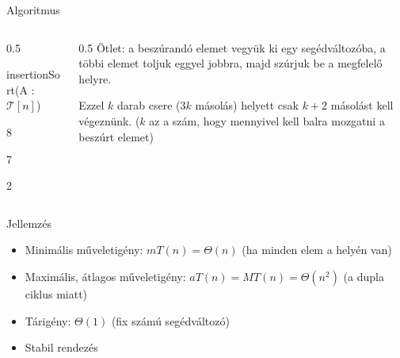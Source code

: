 \documentclass[hungarian]{beamer}
\begin{document}
\begin{frame}{Algoritmus}

\begin{columns}
\begin{column}{0.5\linewidth}

\setlength{\stukiwidth}{6cm}
\begin{stukibox*}{insertionSort(A : $\mathcal{T}[n]$)}
\begin{WHILE}{8}{}
\begin{IF}[70]{7}{}
\begin{WHILE}{2}{}
\end{WHILE}
\ELSE
{}
\end{IF}
\end{WHILE}
\end{stukibox*}

\end{column}
\begin{column}{0.5\linewidth}
Ötlet: a beszúrandó elemet vegyük ki egy segédváltozóba, a többi elemet toljuk eggyel jobbra, majd szúrjuk be a megfelelő helyre.

\vspace{1em}

Ezzel $k$ darab csere ($3k$ másolás) helyett csak $k+2$ másolást kell végeznünk. ($k$ az a szám, hogy mennyivel kell balra mozgatni a beszúrt elemet)

\end{column}
\end{columns}

\end{frame}

\begin{frame}{Jellemzés}

\begin{itemize}
    \item Minimális műveletigény: $mT(n) = \Theta(n)$ (ha minden elem a helyén van)
    \item Maximális, átlagos műveletigény: $aT(n) = MT(n) = \Theta(n^2)$ (a dupla ciklus miatt)
    \item Tárigény: $\Theta(1)$ (fix számú segédváltozó)
    \item Stabil rendezés
\end{itemize}
    
\end{frame}
\end{document}
